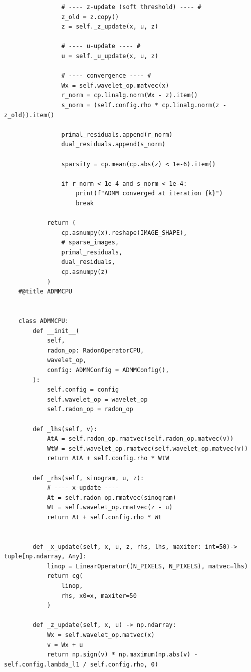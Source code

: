 \begin{verbatim}
                # ---- z-update (soft threshold) ---- #
                z_old = z.copy()
                z = self._z_update(x, u, z)

                # ---- u-update ---- #
                u = self._u_update(x, u, z)

                # ---- convergence ---- #
                Wx = self.wavelet_op.matvec(x)
                r_norm = cp.linalg.norm(Wx - z).item()
                s_norm = (self.config.rho * cp.linalg.norm(z - z_old)).item()

                primal_residuals.append(r_norm)
                dual_residuals.append(s_norm)

                sparsity = cp.mean(cp.abs(z) < 1e-6).item()

                if r_norm < 1e-4 and s_norm < 1e-4:
                    print(f"ADMM converged at iteration {k}")
                    break

            return (
                cp.asnumpy(x).reshape(IMAGE_SHAPE),
                # sparse_images,
                primal_residuals,
                dual_residuals,
                cp.asnumpy(z)
            )
    #@title ADMMCPU


    class ADMMCPU:
        def __init__(
            self,
            radon_op: RadonOperatorCPU,
            wavelet_op,
            config: ADMMConfig = ADMMConfig(),
        ):
            self.config = config
            self.wavelet_op = wavelet_op
            self.radon_op = radon_op

        def _lhs(self, v):
            AtA = self.radon_op.rmatvec(self.radon_op.matvec(v))
            WtW = self.wavelet_op.rmatvec(self.wavelet_op.matvec(v))
            return AtA + self.config.rho * WtW

        def _rhs(self, sinogram, u, z):
            # ---- x-update ----
            At = self.radon_op.rmatvec(sinogram)
            Wt = self.wavelet_op.rmatvec(z - u)
            return At + self.config.rho * Wt


        def _x_update(self, x, u, z, rhs, lhs, maxiter: int=50)-> tuple[np.ndarray, Any]:
            linop = LinearOperator((N_PIXELS, N_PIXELS), matvec=lhs)
            return cg(
                linop,
                rhs, x0=x, maxiter=50
            )

        def _z_update(self, x, u) -> np.ndarray:
            Wx = self.wavelet_op.matvec(x)
            v = Wx + u
            return np.sign(v) * np.maximum(np.abs(v) - self.config.lambda_l1 / self.config.rho, 0)


\end{verbatim}
